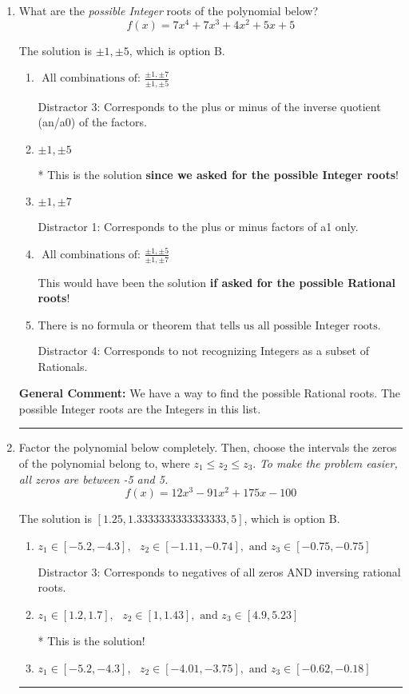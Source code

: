 \documentclass{extbook}[14pt]
\newcommand{\litem}[1]{\item #1

\rule{\textwidth}{0.4pt}}
\begin{document}
\begin{enumerate}\litem{
What are the \textit{possible Integer} roots of the polynomial below?
\[ f(x) = 7x^{4} +7 x^{3} +4 x^{2} +5 x + 5 \]

The solution is \( \pm 1,\pm 5 \), which is option B.\begin{enumerate}[label=\Alph*.]
\item \( \text{ All combinations of: }\frac{\pm 1,\pm 7}{\pm 1,\pm 5} \)

 Distractor 3: Corresponds to the plus or minus of the inverse quotient (an/a0) of the factors. 
\item \( \pm 1,\pm 5 \)

* This is the solution \textbf{since we asked for the possible Integer roots}!
\item \( \pm 1,\pm 7 \)

 Distractor 1: Corresponds to the plus or minus factors of a1 only.
\item \( \text{ All combinations of: }\frac{\pm 1,\pm 5}{\pm 1,\pm 7} \)

This would have been the solution \textbf{if asked for the possible Rational roots}!
\item \( \text{There is no formula or theorem that tells us all possible Integer roots.} \)

 Distractor 4: Corresponds to not recognizing Integers as a subset of Rationals.
\end{enumerate}

\textbf{General Comment:} We have a way to find the possible Rational roots. The possible Integer roots are the Integers in this list.
}
\litem{
Factor the polynomial below completely. Then, choose the intervals the zeros of the polynomial belong to, where $z_1 \leq z_2 \leq z_3$. \textit{To make the problem easier, all zeros are between -5 and 5.}
\[ f(x) = 12x^{3} -91 x^{2} +175 x -100 \]

The solution is \( [1.25, 1.3333333333333333, 5] \), which is option B.\begin{enumerate}[label=\Alph*.]
\item \( z_1 \in [-5.2, -4.3], \text{   }  z_2 \in [-1.11, -0.74], \text{   and   } z_3 \in [-0.75, -0.75] \)

 Distractor 3: Corresponds to negatives of all zeros AND inversing rational roots.
\item \( z_1 \in [1.2, 1.7], \text{   }  z_2 \in [1, 1.43], \text{   and   } z_3 \in [4.9, 5.23] \)

* This is the solution!
\item \( z_1 \in [-5.2, -4.3], \text{   }  z_2 \in [-4.01, -3.75], \text{   and   } z_3 \in [-0.62, -0.18] \)


\end{enumerate}}
\end{enumerate}
\end{document}
